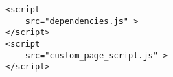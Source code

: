 \begin{lstlisting}[label=include-script,style=htmlcssjs,caption=\textit{Including Script }pada \textit{View}]
<script 
	src="dependencies.js" >
</script>
<script 
	src="custom_page_script.js" >
</script>
\end{lstlisting}